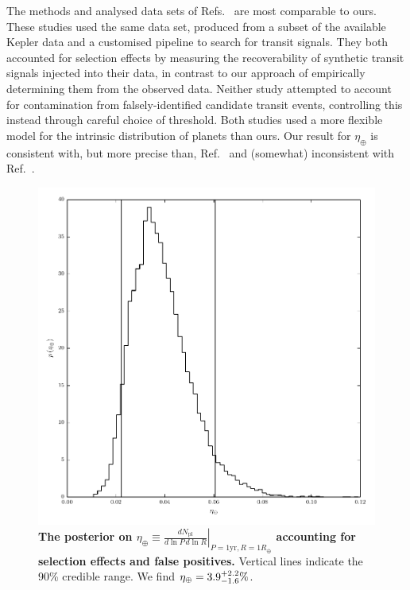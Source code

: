 \documentclass{nature}
\newcommand{\etaearth}{\eta_\oplus}
\newcommand{\REarth}{R_\oplus}
\begin{document}
The methods and analysed data sets of
Refs.\ \cite{Petigura2013,Foreman-Mackey2014} are most comparable to
ours.  These studies used the same data set,
produced\cite{Petigura2013} from a subset of the available Kepler data
and a customised pipeline to search for transit signals.  They both
accounted for selection effects by measuring the recoverability of
synthetic transit signals injected into their data, in contrast to our
approach of empirically determining them from the observed data.
Neither study attempted to account for contamination from
falsely-identified candidate transit events, controlling this instead
through careful choice of threshold.  Both studies used a more
flexible model for the intrinsic distribution of planets than ours.
Our result for $\etaearth$ is consistent with, but more precise than,
Ref.\ \cite{Foreman-Mackey2014} and (somewhat) inconsistent with
Ref.\ \cite{Petigura2013}.  


\begin{figure}
  \includegraphics[width=\columnwidth]{eta-earth}
  \caption{\label{fig:eta-earth} \textbf{The posterior on $\etaearth \equiv \left. \frac{dN_\mathrm{pl}}{d\ln P \,d \ln
      R} \right|_{P = 1\mathrm{yr}, R=1\REarth}$
      accounting for selection effects and false positives.}  Vertical lines
    indicate the 90\% credible range.  We find $\etaearth = \earange$.}
\end{figure}
\end{document}

